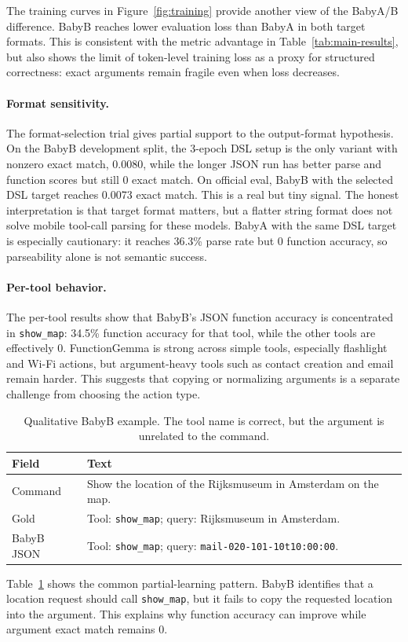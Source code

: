 The training curves in Figure~\ref{fig:training} provide another view of the BabyA/B difference. BabyB reaches lower evaluation loss than BabyA in both target formats. This is consistent with the metric advantage in Table~\ref{tab:main-results}, but also shows the limit of token-level training loss as a proxy for structured correctness: exact arguments remain fragile even when loss decreases.

\paragraph{Format sensitivity.}
The format-selection trial gives partial support to the output-format hypothesis. On the BabyB development split, the 3-epoch DSL setup is the only variant with nonzero exact match, 0.0080, while the longer JSON run has better parse and function scores but still 0 exact match. On official eval, BabyB with the selected DSL target reaches 0.0073 exact match. This is a real but tiny signal. The honest interpretation is that target format matters, but a flatter string format does not solve mobile tool-call parsing for these models. BabyA with the same DSL target is especially cautionary: it reaches 36.3\% parse rate but 0 function accuracy, so parseability alone is not semantic success.

\paragraph{Per-tool behavior.}
The per-tool results show that BabyB's JSON function accuracy is concentrated in \texttt{show\_map}: 34.5\% function accuracy for that tool, while the other tools are effectively 0. FunctionGemma is strong across simple tools, especially flashlight and Wi-Fi actions, but argument-heavy tools such as contact creation and email remain harder. This suggests that copying or normalizing arguments is a separate challenge from choosing the action type.

\begin{table}[t]
\centering
\small
\begin{tabular}{p{}p{}}
\toprule
Field & Text \\
\midrule
Command & Show the location of the Rijksmuseum in Amsterdam on the map. \\
Gold & Tool: \texttt{show\_map}; query: Rijksmuseum in Amsterdam. \\
BabyB JSON & Tool: \texttt{show\_map}; query: \texttt{mail-020-101-10t10:00:00}. \\
\bottomrule
\end{tabular}
\caption{Qualitative BabyB example. The tool name is correct, but the argument is unrelated to the command.}
\label{tab:qual}
\end{table}

Table~\ref{tab:qual} shows the common partial-learning pattern. BabyB identifies that a location request should call \texttt{show\_map}, but it fails to copy the requested location into the argument. This explains why function accuracy can improve while argument exact match remains 0.
